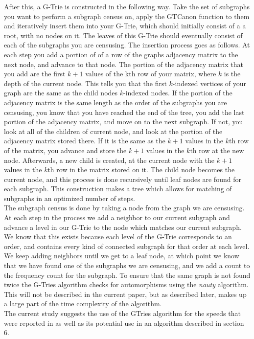 After this, a G-Trie is constructed in the following way. Take the set of subgraphs you want to perform a subgraph census on, apply the GTCanon function to them and iteratively insert them into your G-Trie, which should initially consist of a a root, with no nodes on it. The leaves of this G-Trie should eventually consist of each of the subgraphs you are censusing. The insertion process goes as follows. At each step you add a portion of of a row of the graphs adjacency matrix to the next node, and advance to that node. The portion of the adjacency matrix that you add are the first $k+1$ values of the kth row of your matrix, where $k$ is the depth of the current node. This tells you that the first $k$-indexed vertices of your graph are the same as the child nodes $k$-indexed nodes. If the portion of the adjacency matrix is the same length as the order of the subgraphs you are censusing, you know that you have reached the end of the tree, you add the last portion of the adjacency matrix, and move on to the next subgraph. If not, you look at all of the children of current node, and look at the portion of the adjacency matrix stored there. If it is the same as the $k+1$ values in the $k$th row of the matrix, you advance and store the $k+1$ values in the $k$th row at the new node. Afterwards, a new child is created, at the current node with the $k+1$ values in the $k$th row in the matrix stored on it. The child node becomes the current node, and this process is done recursively until leaf nodes are found for each subgraph. This construction makes a tree which allows for matching of subgraphs in an optimized number of steps.\\ 
The subgraph census is done by taking a node from the graph we are censusing. At each step in the process we add a neighbor to our current subgraph and advance a level in our G-Trie to the node which matches our current subgraph. We know that this exists because each level of the G-Trie corresponds to an order, and contains every kind of connected subgraph for that order at each level. We keep adding neighbors until we get to a leaf node, at which point we know that we have found one of the subgraphs we are censusing, and we add a count to the frequency count for the subgraph. To ensure that the same graph is not found twice the G-Tries algorithm checks for automorphisms using the \emph{nauty} algorithm. This will not be described in the current paper, but as described later, makes up a large part of the time complexity of the algorithm.\\
The current study suggests the use of the GTries algorithm for the speeds that were reported in \cite{ribeiro11} as well as its potential use in an algorithm described in section 6.
